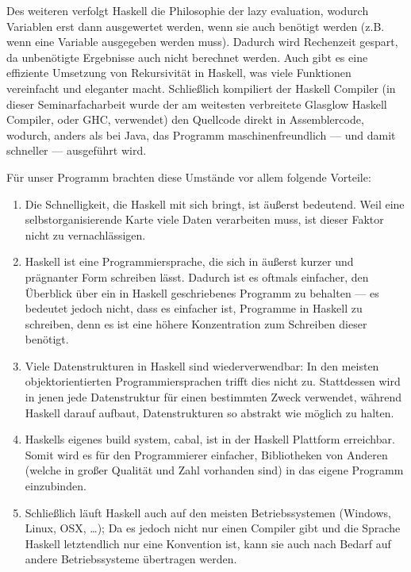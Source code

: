 \documentclass[twoside,a4paper]{article}
\begin{document}
Des weiteren verfolgt Haskell die Philosophie der \glqq{}lazy evaluation\grqq{}, wodurch Variablen erst dann ausgewertet werden, wenn sie auch benötigt werden (z.B. wenn eine Variable ausgegeben werden muss). Dadurch wird Rechenzeit gespart, da unbenötigte Ergebnisse auch nicht berechnet werden. Auch gibt es eine effiziente Umsetzung von Rekursivität in Haskell, was viele Funktionen vereinfacht und eleganter macht. Schließlich kompiliert der Haskell Compiler (in dieser Seminarfacharbeit wurde der am weitesten verbreitete Glasglow Haskell Compiler, oder GHC, verwendet) den Quellcode direkt in Assemblercode, wodurch, anders als bei Java, das Programm maschinenfreundlich --- und damit schneller --- ausgeführt wird.

Für unser Programm brachten diese Umstände vor allem folgende Vorteile:

\begin{enumerate}
\item Die Schnelligkeit, die Haskell mit sich bringt, ist äußerst bedeutend. Weil eine selbstorganisierende Karte viele Daten verarbeiten muss, ist dieser Faktor nicht zu vernachlässigen.

\item Haskell ist eine Programmiersprache, die sich in äußerst kurzer und prägnanter Form schreiben lässt. Dadurch ist es oftmals einfacher, den Überblick über ein in Haskell geschriebenes Programm zu behalten --- es bedeutet jedoch nicht, dass es einfacher ist, Programme in Haskell zu schreiben, denn es ist eine höhere Konzentration zum Schreiben dieser benötigt.

\item Viele Datenstrukturen in Haskell sind wiederverwendbar: In den meisten objektorientierten Programmiersprachen trifft dies nicht zu. Stattdessen wird in jenen jede Datenstruktur für einen bestimmten Zweck verwendet, während Haskell darauf aufbaut, Datenstrukturen so abstrakt wie möglich zu halten.

\item Haskells eigenes \glqq{}build system\grqq{}, cabal, ist in der Haskell Plattform erreichbar. Somit wird es für den Programmierer einfacher, Bibliotheken von Anderen (welche in großer Qualität und Zahl vorhanden sind) in das eigene Programm einzubinden.

\item Schließlich läuft Haskell auch auf den meisten Betriebssystemen (Windows, Linux, OSX, \dots{}); Da es jedoch nicht nur einen Compiler gibt und die Sprache Haskell letztendlich nur eine Konvention ist, kann sie auch nach Bedarf auf andere Betriebssysteme übertragen werden.
\end{enumerate}
\end{document}
